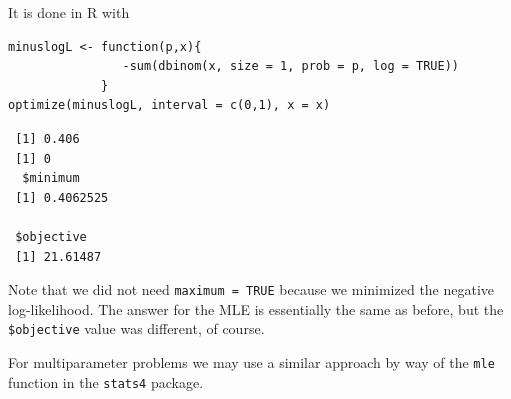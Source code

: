 \documentclass[captions=tableheading]{scrbook}
\begin{document}
It is done in \textsf{R} with


\begin{verbatim}
minuslogL <- function(p,x){
                -sum(dbinom(x, size = 1, prob = p, log = TRUE))
             }
optimize(minuslogL, interval = c(0,1), x = x)
\end{verbatim}

\begin{verbatim}
 [1] 0.406
 [1] 0
  $minimum
 [1] 0.4062525
 
 $objective
 [1] 21.61487
\end{verbatim}

Note that we did not need \texttt{maximum = TRUE} because we minimized the negative log-likelihood. The answer for the MLE is essentially the same as before, but the \texttt{\$objective} value was different, of course.

For multiparameter problems we may use a similar approach by way of the \texttt{mle} function in the \texttt{stats4} package. 
\end{document}
